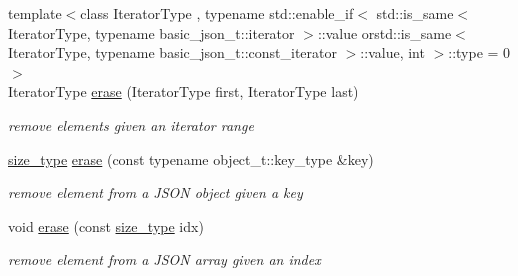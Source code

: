 \begin{DoxyCompactItemize}
{\footnotesize template$<$class Iterator\+Type , typename std\+::enable\+\_\+if$<$ std\+::is\+\_\+same$<$ Iterator\+Type, typename basic\+\_\+json\+\_\+t\+::iterator $>$\+::value orstd\+::is\+\_\+same$<$ Iterator\+Type, typename basic\+\_\+json\+\_\+t\+::const\+\_\+iterator $>$\+::value, int $>$\+::type  = 0$>$ }\\Iterator\+Type \hyperlink{classnlohmann_1_1basic__json_a4b3f7eb2d4625d95a51fbbdceb7c5f39}{erase} (Iterator\+Type first, Iterator\+Type last)
\begin{DoxyCompactList}\small\item\em remove elements given an iterator range \end{DoxyCompactList}\item 
\hyperlink{classnlohmann_1_1basic__json_a39f2cd0b58106097e0e67bf185cc519b}{size\+\_\+type} \hyperlink{classnlohmann_1_1basic__json_a2f8484d69c55d8f2a9697a7bec29362a}{erase} (const typename object\+\_\+t\+::key\+\_\+type \&key)
\begin{DoxyCompactList}\small\item\em remove element from a J\+S\+ON object given a key \end{DoxyCompactList}\item 
void \hyperlink{classnlohmann_1_1basic__json_a88cbcefe9a3f4d294bed0653550a5cb9}{erase} (const \hyperlink{classnlohmann_1_1basic__json_a39f2cd0b58106097e0e67bf185cc519b}{size\+\_\+type} idx)
\begin{DoxyCompactList}\small\item\em remove element from a J\+S\+ON array given an index \end{DoxyCompactList}\end{DoxyCompactItemize}

